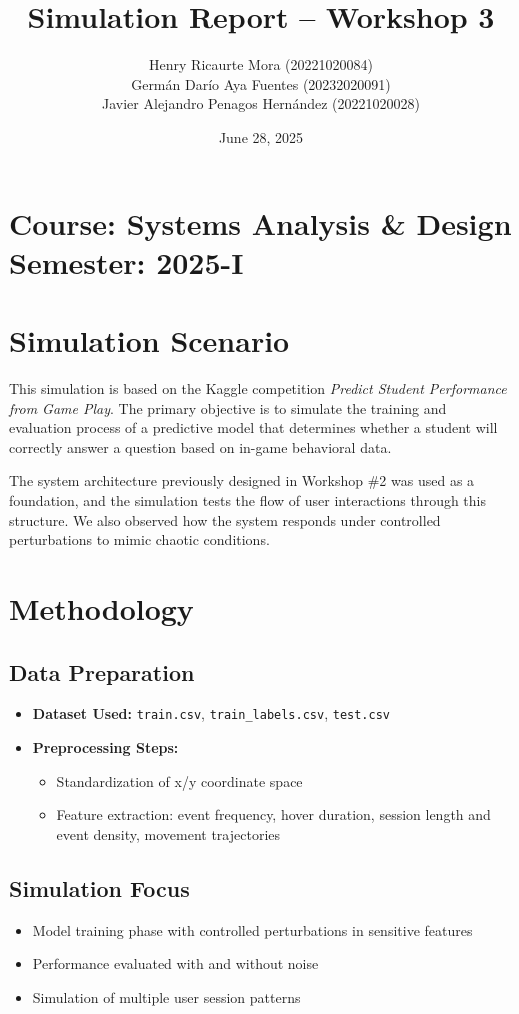 \documentclass[12pt]{article}
\title{Simulation Report – Workshop 3}
\author{
	Henry Ricaurte Mora (20221020084)\\
	Germán Darío Aya Fuentes (20232020091)\\
	Javier Alejandro Penagos Hernández (20221020028)
}
\date{June 28, 2025}
\begin{document}
	
	\maketitle
	
	\section*{Course: Systems Analysis \& Design \hfill Semester: 2025-I}
	
	\section{Simulation Scenario}
	This simulation is based on the Kaggle competition \textit{Predict Student Performance from Game Play}. The primary objective is to simulate the training and evaluation process of a predictive model that determines whether a student will correctly answer a question based on in-game behavioral data.
	
	The system architecture previously designed in Workshop \#2 was used as a foundation, and the simulation tests the flow of user interactions through this structure. We also observed how the system responds under controlled perturbations to mimic chaotic conditions.
	
	\section{Methodology}
	
	\subsection{Data Preparation}
\begin{itemize}
	\item \textbf{Dataset Used:} \texttt{train.csv}, \texttt{train\_labels.csv}, \texttt{test.csv}
	\item \textbf{Preprocessing Steps:}
	\begin{itemize}
		\item Standardization of x/y coordinate space
		\item Feature extraction: event frequency, hover duration, session length and event density, movement trajectories
	\end{itemize}
\end{itemize}

	
	\subsection{Simulation Focus}
	\begin{itemize}
		\item Model training phase with controlled perturbations in sensitive features
		\item Performance evaluated with and without noise
		\item Simulation of multiple user session patterns
	\end{itemize}
	
\end{document}

